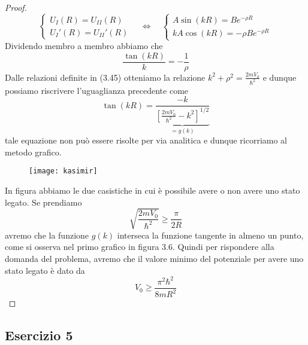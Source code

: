 \begin{proof}
\begin{equation*}
	\left \{ \begin{array}{l}
		U_{I}(R) = U_{II}(R) \\
		U_{I}'(R) = U_{II}'(R)
	\end{array}\right. \quad \iff \quad 
	\left \{ \begin{array}{l}
		A \sin(kR) = Be^{-\rho R} \\
		kA \cos(kR) = -\rho Be^{-\rho R}
	\end{array}\right.
\end{equation*}
Dividendo membro a membro abbiamo che 
\begin{equation*}
	\frac{\tan(kR)}{k} = - \frac{1}{\rho} 
\end{equation*}
Dalle relazioni definite in (3.45) otteniamo la relazione $k^2 + \rho^2 = \frac{2mV_0}{\hbar^2}$ e dunque possiamo riscrivere l'uguaglianza precedente come
\begin{equation*}
	\tan(kR) = \underbrace{\frac{-k}{\left [ \frac{2mV_0}{\hbar^2} - k^2\right]^{1/2}}}_{=g(k)}
\end{equation*}
tale equazione non pu\`o essere risolte per via analitica e dunque ricorriamo al metodo grafico.
\newpage
 
\begin{figure}[!ht]
\vspace{0.1in}
\texttt{[image: kasimir]}	
\centering
\vspace{0.1in}
\caption{}
\end{figure}
In figura abbiamo le due casistiche in cui \`e possibile avere o non avere uno stato legato. Se prendiamo 
\begin{equation*}
	\sqrt{\frac{2mV_0}{\hbar^2}} \geq \frac{\pi}{2R}
\end{equation*}
avremo che la funzione $g(k)$ interseca la funzione tangente in almeno un punto, come si osserva nel primo grafico in figura 3.6. Quindi per rispondere alla domanda del problema, avremo che il valore minimo del potenziale per avere uno stato legato \`e dato da 
\begin{equation*}
	V_0 \geq  \frac{\pi^2 \hbar^2}{8mR^2}
\end{equation*}

\end{proof}

\subsection{Esercizio 5}

